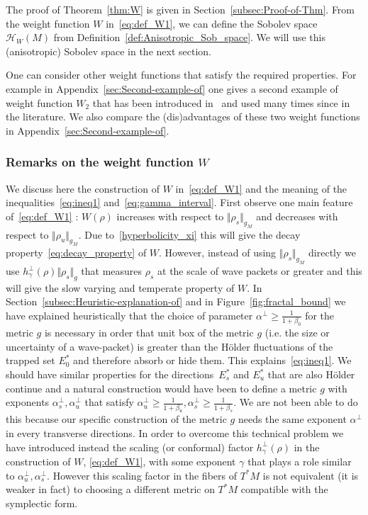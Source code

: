 \documentclass[AHL,Unicode,longabstracts,published]{cedram}
\newcommand{\clH}{\mathcal{H}}
\newcommand{\clH}{\mathcal{H}}
\begin{document}
The proof of Theorem~\ref{thm:W} is given in Section~\ref{subsec:Proof-of-Thm}. From the weight function $W$ in~\eqref{eq:def_W1}, we can define the Sobolev space $\clH _{W}(M)$ from Definition~\ref{def:Anisotropic_Sob_space}. We will use this (anisotropic) Sobolev space in the next section.


\begin{rema}
One can consider other weight functions that satisfy the required properties. For example in Appendix~\ref{sec:Second-example-of} one gives a second example of weight function $W_{2}$ that has been introduced in~\cite{fred-roy-sjostrand-07,fred_flow_09} and used many times since in the literature. We also compare the (dis)advantages of these two weight functions in Appendix~\ref{sec:Second-example-of}.
\end{rema}


\subsubsection{Remarks on the weight function \texorpdfstring{$W$}{W}}\label{rem:Due-to-the}

We discuss here the construction of $W$ in~\eqref{eq:def_W1} and the meaning of the inequalities~\eqref{eq:ineq1} and~\eqref{eq:gamma_interval}. First observe one main feature of~\eqref{eq:def_W1} : $W(\rho)$ increases with respect to $\Vert \rho_{s}\Vert _{g_{M}}$ and decreases with respect to $\Vert \rho_{u}\Vert _{g_{M}}$. Due to~\eqref{hyperbolicity_xi} this will give the decay property~\eqref{eq:decay_property} of $W$. However, instead of using $\Vert \rho_{s}\Vert _{g_{M}}$ directly we use $h_{\gamma}^{\perp}(\rho)\Vert \rho_{s}\Vert _{g}$ that measures $\rho_{s}$ at the scale of wave packets or greater and this will give the slow varying and temperate property of $W$. In Section~\ref{subsec:Heuristic-explanation-of} and in Figure~\ref{fig:fractal_bound} we have explained heuristically that the choice of parameter $\alpha^{\perp}\geq\frac{1}{1+\beta_{0}}$ for the metric $g$ is necessary in order that unit box of the metric $g$ (i.e. the size or uncertainty of a wave-packet) is greater than the H\"older fluctuations of the trapped set $E_{0}^{*}$ and therefore absorb or hide them. This explains~\eqref{eq:ineq1}. We should have similar properties for the directions~$E_{s}^{*}$ and $E_{u}^{*}$ that are also H\"older continue and a natural construction would have been to define a metric $g$ with exponents $\alpha_{s}^{\perp},\alpha_{u}^{\perp}$ that satisfy $\alpha_{u}^{\perp}\geq\frac{1}{1+\beta_{u}},\alpha_{s}^{\perp}\geq\frac{1}{1+\beta_{s}}$. We are not been able to do this because our specific construction of the metric $g$ needs the same exponent $\alpha^{\perp}$ in every transverse directions. In order to overcome this technical problem we have introduced instead the scaling (or conformal) factor $h_{\gamma}^{\perp}(\rho)$ in the construction of $W$, \eqref{eq:def_W1}, with some exponent $\gamma$ that plays a role similar to $\alpha_{u}^{\perp},\alpha_{s}^{\perp}$. However this scaling factor in the fibers of $T^{*}M$ is not equivalent (it is weaker in fact) to choosing a different metric on $T^{*}M$ compatible with the symplectic form.
\end{document}
